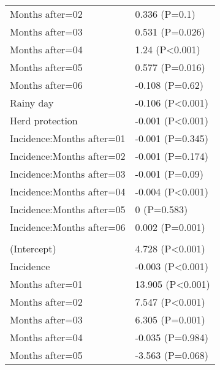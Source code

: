 \documentclass[]{article}
\begin{document}
\begin{longtable}[t]{ll}
\hspace{1em}Months after=02 & 0.336 (P=0.1)\\
\hspace{1em}Months after=03 & 0.531 (P=0.026)\\
\hspace{1em}Months after=04 & 1.24 (P<0.001)\\
\hspace{1em}Months after=05 & 0.577 (P=0.016)\\
\hspace{1em}Months after=06 & -0.108 (P=0.62)\\
\hspace{1em}Rainy day & -0.106 (P<0.001)\\
\hspace{1em}Herd protection & -0.001 (P<0.001)\\
\hspace{1em}Incidence:Months after=01 & -0.001 (P=0.345)\\
\hspace{1em}Incidence:Months after=02 & -0.001 (P=0.174)\\
\hspace{1em}Incidence:Months after=03 & -0.001 (P=0.09)\\
\hspace{1em}Incidence:Months after=04 & -0.004 (P<0.001)\\
\hspace{1em}Incidence:Months after=05 & 0 (P=0.583)\\
\hspace{1em}Incidence:Months after=06 & 0.002 (P=0.001)\\
\addlinespace[1.5em]
\multicolumn{2}{l}{\textbf{Temporary not field worker}}\\
\hspace{1em}(Intercept) & 4.728 (P<0.001)\\
\hspace{1em}Incidence & -0.003 (P<0.001)\\
\hspace{1em}Months after=01 & 13.905 (P<0.001)\\
\hspace{1em}Months after=02 & 7.547 (P<0.001)\\
\hspace{1em}Months after=03 & 6.305 (P=0.001)\\
\hspace{1em}Months after=04 & -0.035 (P=0.984)\\
\hspace{1em}Months after=05 & -3.563 (P=0.068)\\

\end{longtable}
\end{document}
